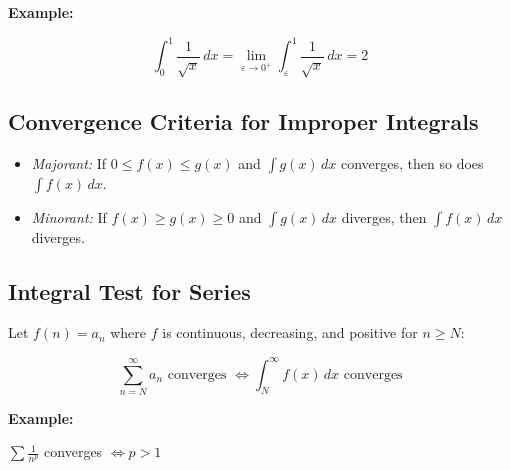 \textbf{Example:}

\[
    \int_0^1 \frac{1}{\sqrt{x}}\,dx = \lim_{\varepsilon \to 0^+} \int_\varepsilon^1 \frac{1}{\sqrt{x}}\,dx = 2
\]

\subsection{Convergence Criteria for Improper Integrals}

\begin{itemize}

    \item \emph{Majorant:} If \(0 \le f(x) \le g(x)\) and \(\int g(x)\,dx\) converges, then so does \(\int f(x)\,dx\).

    \item \emph{Minorant:} If \(f(x) \ge g(x) \ge 0\) and \(\int g(x)\,dx\) diverges, then \(\int f(x)\,dx\) diverges.

\end{itemize}

\subsection{Integral Test for Series}

Let \(f(n) = a_n\) where \(f\) is continuous, decreasing, and positive for \(n \ge N\):

\[
    \sum_{n=N}^\infty a_n \text{ converges } \iff \int_N^\infty f(x)\,dx \text{ converges}
\]

\textbf{Example:}

\(\sum \frac{1}{n^p}\) converges \(\iff p > 1\)
